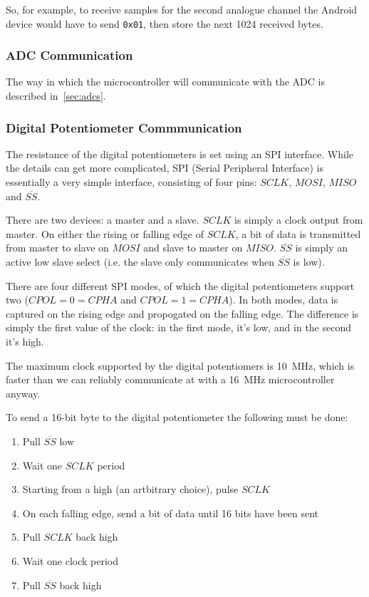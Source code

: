 So, for example, to receive samples for the second analogue channel the Android
device would have to send \texttt{0x01}, then store the next 1024 received bytes.

\subsubsection{ADC Communication}
The way in which the microcontroller will communicate with the ADC is described
in~\cref{sec:adcs}.

\subsubsection{Digital Potentiometer Commmunication}

The resistance of the digital potentiometers is set using an SPI interface.
While the details can get more complicated, SPI (Serial Peripheral Interface) is
essentially a very simple interface, consisting of four pins: $SCLK$, $MOSI$,
$MISO$ and $\overline{SS}$.

There are two devices: a master and a slave. $SCLK$ is simply a clock output
from master. On either the rising or falling edge of $SCLK$, a bit of data is
transmitted from master to slave on $MOSI$ and slave to master on $MISO$.
$\overline{SS}$ is simply an active low slave select (i.e. the slave only
communicates when $\overline{SS}$ is low).

There are four different SPI modes, of which the digital potentiometers support
two ($CPOL=0=CPHA$ and $CPOL=1=CPHA$). In both modes, data is captured on the
rising edge and propogated on the falling edge. The difference is simply the
first value of the clock: in the first mode, it's low, and in the second it's
high.

The maximum clock supported by the digital potentiomers is \SI{10}{\MHz}, which
is faster than we can reliably communicate at with a \SI{16}{\MHz}
microcontroller anyway.

To send a 16-bit byte to the digital potentiometer the following must be done:
\begin{enumerate}
  \item Pull $\overline{SS}$ low
  \item Wait one $SCLK$ period
  \item Starting from a high (an artbitrary choice), pulse $SCLK$
  \item On each falling edge, send a bit of data until 16 bits have been sent
  \item Pull $SCLK$ back high
  \item Wait one clock period
  \item Pull $\overline{SS}$ back high
\end{enumerate}

